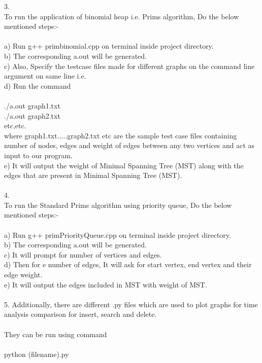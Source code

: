 3. \\To run the application of binomial heap i.e. Prims algorithm, Do the below mentioned steps:- \\ \\a) Run g++ primbinomial.cpp on terminal inside project directory.\\
b) The corresponding a.out will be generated. \\
c) Also, Specify the testcase files made for different graphs on the command line argument on same line i.e. \\
d) Run the command\\ \\
./a.out graph1.txt\\
./a.out graph2.txt\\ etc,etc. \\

where graph1.txt.....graph2.txt etc are the sample test case files containing number of nodes, edges and weight of edges between any two vertices and act as input to our program. \\

e) It will output the weight of Minimal Spanning Tree (MST) along with the edges that are present in Minimal Spanning Tree (MST). \\ \\

4. \\To run the Standard Prims algorithm using priority queue, Do the below mentioned steps:- \\ \\a) Run g++ primPriorityQueue.cpp on terminal inside project directory.\\
b) The corresponding a.out will be generated. \\
c) It will prompt for number of vertices and edges. \\
d) Then for e number of edges, It will ask for start vertex, end vertex and their edge weight. \\
e) It will output the edges included in MST with weight of MST.\\ \\

5. Additionally, there are different .py files which are used to plot graphs for time analysis comparison for insert, search and delete.\\ \\
They can be run using command \\ \\
python (filename).py \\ \\

